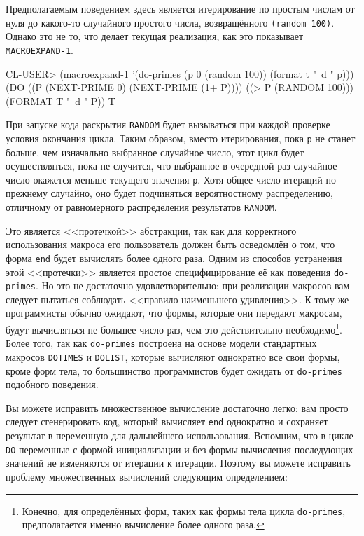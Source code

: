 Предполагаемым поведением здесь является итерирование по простым числам от нуля до
какого-то случайного простого числа, возвращённого \lstinline{(random 100)}. Однако это не то,
что делает текущая реализация, как это показывает \lstinline{MACROEXPAND-1}.

\begin{myverb}
CL-USER> (macroexpand-1 '(do-primes (p 0 (random 100)) (format t "~d " p)))
(DO ((P (NEXT-PRIME 0) (NEXT-PRIME (1+ P))))
    ((> P (RANDOM 100)))
  (FORMAT T "~d " P))
T
\end{myverb}

При запуске кода раскрытия \lstinline{RANDOM} будет вызываться при каждой проверке условия
окончания цикла. Таким образом, вместо итерирования, пока \lstinline{p} не станет больше, чем
изначально выбранное случайное число, этот цикл будет осуществляться, пока не случится, что
выбранное в очередной раз случайное число окажется меньше текущего значения \lstinline{p}. Хотя
общее число итераций по-прежнему случайно, оно будет подчиняться вероятностному
распределению, отличному от равномерного распределения результатов \lstinline{RANDOM}.

Это является <<протечкой>> абстракции, так как для корректного использования макроса его
пользователь должен быть осведомлён о том, что форма \lstinline{end} будет вычислять более
одного раза. Одним из способов устранения этой <<протечки>> является простое
специфицирование её как поведения \lstinline{do-primes}. Но это не достаточно
удовлетворительно: при реализации макросов вам следует пытаться соблюдать <<правило
наименьшего удивления>>. К тому же программисты обычно ожидают, что формы, которые они
передают макросам, будут вычисляться не большее число раз, чем это действительно
необходимо\footnote{Конечно, для определённых форм, таких как формы тела цикла
  \lstinline{do-primes}, предполагается именно вычисление более одного раза.}. Более того, так
как \lstinline{do-primes} построена на основе модели стандартных макросов \lstinline{DOTIMES} и
\lstinline{DOLIST}, которые вычисляют однократно все свои формы, кроме форм тела, то
большинство программистов будет ожидать от \lstinline{do-primes} подобного поведения.

Вы можете исправить множественное вычисление достаточно легко: вам просто следует
сгенерировать код, который вычисляет \lstinline{end} однократно и сохраняет результат в
переменную для дальнейшего использования. Вспомним, что в цикле \lstinline{DO} переменные с
формой инициализации и без формы вычисления последующих значений не изменяются от итерации
к итерации. Поэтому вы можете исправить проблему множественных вычислений следующим
определением:

